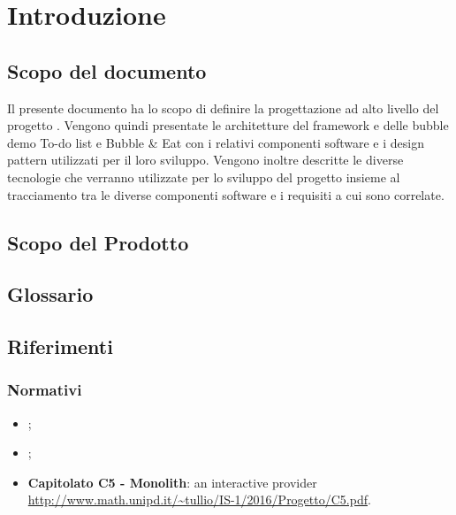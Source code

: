 \section{Introduzione}

\subsection{Scopo del documento}
Il presente documento ha lo scopo di definire la progettazione ad alto livello del progetto \ProjectName{}. Vengono quindi presentate le architetture del framework e delle bubble demo To-do list e Bubble \& Eat con i relativi componenti software e i design pattern utilizzati per il loro sviluppo. Vengono inoltre descritte le diverse tecnologie che verranno utilizzate per lo sviluppo del progetto insieme al tracciamento tra le diverse componenti software e i requisiti a cui sono correlate.

\subsection{Scopo del Prodotto}
\ScopoDelProdotto

\subsection{Glossario}
\GlossarioIntroduzione

\subsection{Riferimenti}
\subsubsection{Normativi}
\begin{itemize}
	\item \textbf{\NormeDiProgetto};
	\item \textbf{\AnalisiDeiRequisiti};
	\item \textbf{Capitolato C5 - Monolith}: an interactive 
	provider\\ \url{http://www.math.unipd.it/~tullio/IS-1/2016/Progetto/C5.pdf}.
\end{itemize}
